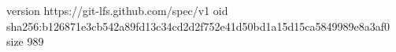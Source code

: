 version https://git-lfs.github.com/spec/v1
oid sha256:b126871e3cb542a89fd13c34cd2d2f752e41d50bd1a15d15ca5849989e8a3af0
size 989
